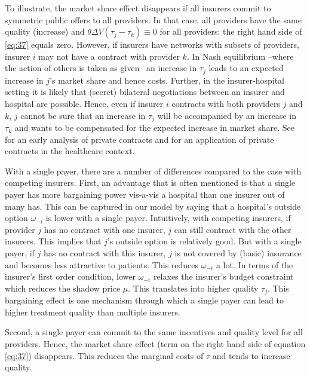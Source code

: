 \documentclass[a4paper,12pt]{article}
\begin{document}
To illustrate, the market share effect disappears if all insurers commit to symmetric public offers to all providers. In that case, all providers have the same quality (increase) and \(\theta \Delta V (\tau_j - \tau_k) \equiv 0\) for all providers: the right hand side of \eqref{eq:37} equals zero. However, if insurers have networks with subsets of providers, insurer \(i\) may not have a contract with provider \(k\). In Nash equilibrium --where the action of others is taken as given-- an increase in \(\tau_j\) leads to an expected increase in \(j\)'s market share and hence costs. Further, in the insurer-hospital setting it is likely that (secret) bilateral negotiations between an insurer and hospital are possible. Hence, even if insurer \(i\) contracts with both providers \(j\) and \(k\), \(j\) cannot be sure that an increase in \(\tau_j\) will be accompanied by an increase in \(\tau_k\) and wants to be compensated for the expected increase in market share. See \cite{HartTirole} for an early analysis of private contracts and \cite{BOONE2019102222} for an application of private contracts in the healthcare context.

With a single payer, there are a number of differences compared to the case with competing insurers. First, an advantage that is often mentioned is that a single payer has more bargaining power vis-a-vis a hospital than one insurer out of many has. This can be captured in our model by saying that a hospital's outside option \(\omega_{-i}\) is lower with a single payer. Intuitively, with competing insurers, if provider \(j\) has no contract with one insurer, \(j\) can still contract with the other insurers. This implies that \(j\)'s outside option is relatively good. But with a single payer, if \(j\) has no contract with this insurer, \(j\) is not covered by (basic) insurance and becomes less attractive to patients. This reduces \(\omega_{-i}\) a lot. In terms of the insurer's first order condition, lower \(\omega_{-i}\) relaxes the insurer's budget constraint which reduces the shadow price \(\mu\). This translates into higher quality \(\tau_j\). This bargaining effect is one mechanism through which a single payer can lead to higher treatment quality than multiple insurers.

Second, a single payer can commit to the same incentives and quality level for all providers. Hence, the market share effect (term on the right hand side of equation \eqref{eq:37}) disappears. This reduces the marginal costs of \(\tau\) and tends to increase quality.
\end{document}
